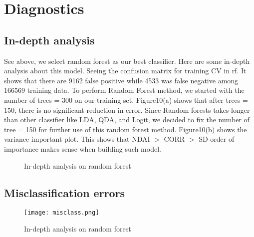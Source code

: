 \documentclass[12pt]{extarticle}
\begin{document}
\section{Diagnostics}
\subsection{In-depth analysis}
See above, we select random forest as our best classifier. Here are some in-depth analysis about this model.
Seeing the confusion matrix for training CV in rf. It shows that there are 9162 false positive while 4533 was false negative among 166569 training data. To perform Random Forest method, we started with the number of trees = 300 on our training set. Figure10(a)  shows that after trees = 150, there is no significant reduction in error. Since Random forests takes longer than other classifier like LDA, QDA, and Logit, we decided to fix the number of tree = 150 for further use of this random forest method. Figure10(b)  shows the variance important plot. This shows that NDAI $>$ CORR $>$ SD order of importance makes sense when building such model. 
\begin{figure}[htb]
\centering
{}
\quad
{}
\caption{In-depth analysis on random forest}\label{fig 1}
\end{figure}

\subsection{Misclassification errors}
\begin{figure}[htb]
\centering

\texttt{[image: misclass.png]}

\caption{In-depth analysis on random forest}\label{fig 1}
\end{figure}
\end{document}
